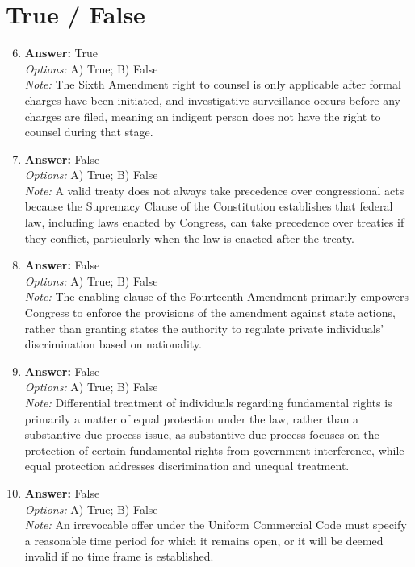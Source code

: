 \documentclass[12pt]{article}
\begin{document}
\section*{True / False}
\begin{enumerate}[label=\arabic*.]
\setcounter{enumi}{5}
\item \textbf{Answer:} True
\\ \textit{Options:} A) True; B) False
\\ \textit{Note:} The Sixth Amendment right to counsel is only applicable after formal charges have been initiated, and investigative surveillance occurs before any charges are filed, meaning an indigent person does not have the right to counsel during that stage.
\item \textbf{Answer:} False
\\ \textit{Options:} A) True; B) False
\\ \textit{Note:} A valid treaty does not always take precedence over congressional acts because the Supremacy Clause of the Constitution establishes that federal law, including laws enacted by Congress, can take precedence over treaties if they conflict, particularly when the law is enacted after the treaty.
\item \textbf{Answer:} False
\\ \textit{Options:} A) True; B) False
\\ \textit{Note:} The enabling clause of the Fourteenth Amendment primarily empowers Congress to enforce the provisions of the amendment against state actions, rather than granting states the authority to regulate private individuals' discrimination based on nationality.
\item \textbf{Answer:} False
\\ \textit{Options:} A) True; B) False
\\ \textit{Note:} Differential treatment of individuals regarding fundamental rights is primarily a matter of equal protection under the law, rather than a substantive due process issue, as substantive due process focuses on the protection of certain fundamental rights from government interference, while equal protection addresses discrimination and unequal treatment.
\item \textbf{Answer:} False
\\ \textit{Options:} A) True; B) False
\\ \textit{Note:} An irrevocable offer under the Uniform Commercial Code must specify a reasonable time period for which it remains open, or it will be deemed invalid if no time frame is established.
\end{enumerate}
\end{document}
